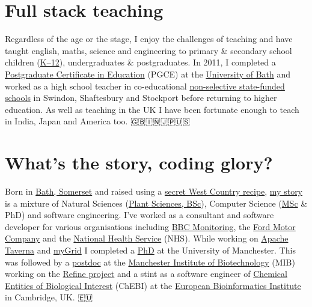 \documentclass[
  12pt,
]{book}
\begin{document}
\hypertarget{full-stack-teaching}{%
\section*{Full stack teaching}\label{full-stack-teaching}}

Regardless of the age or the stage, I enjoy the challenges of teaching and have taught english, maths, science and engineering to primary \& secondary school children (\href{https://en.wikipedia.org/wiki/K\%E2\%80\%9312}{K--12}), undergraduates \& postgraduates. In 2011, I completed a \href{https://en.wikipedia.org/wiki/Postgraduate_Certificate_in_Education}{Postgraduate Certificate in Education} (PGCE) at the \href{https://www.bath.ac.uk/}{University of Bath} and worked as a high school teacher in co-educational \href{https://en.wikipedia.org/wiki/State-funded_schools_(England)}{non-selective state-funded schools} in Swindon, Shaftesbury and Stockport before returning to higher education. As well as teaching in the UK I have been fortunate enough to teach in India, Japan and America too. 🇬🇧🇮🇳🇯🇵🇺🇸

\hypertarget{whats-the-story-coding-glory}{%
\section*{What's the story, coding glory?}\label{whats-the-story-coding-glory}}

Born in \href{https://en.wikipedia.org/wiki/Bath,_Somerset}{Bath, Somerset} and raised using a \href{https://en.wikipedia.org/wiki/West_Country}{secret West Country recipe}, \href{https://uk.linkedin.com/in/duncanhull}{my story} is a mixture of Natural Sciences (\href{http://www.plantsciences.manchester.ac.uk/}{Plant Sciences, BSc}), Computer Science (\href{http://www.cs.man.ac.uk/~hulld/msc2003.html}{MSc} \& PhD) and software engineering. I've worked as a consultant and software developer for various organisations including \href{https://en.wikipedia.org/wiki/BBC_Monitoring}{BBC Monitoring}, the \href{https://en.wikipedia.org/wiki/Ford_Motor_Company}{Ford Motor Company} and the \href{https://en.wikipedia.org/wiki/National_Health_Service}{National Health Service} (NHS). While working on \href{https://en.wikipedia.org/wiki/Apache_Taverna}{Apache Taverna} and \href{https://en.wikipedia.org/wiki/MyGrid}{myGrid} I completed a \href{https://ethos.bl.uk/OrderDetails.do?uin=uk.bl.ethos.497578}{PhD} at the University of Manchester. This was followed by a \href{https://en.wikipedia.org/wiki/Postdoctoral_researcher}{postdoc} at the \href{http://www.mib.ac.uk/}{Manchester Institute of Biotechnology} (MIB) working on the \href{http://www.nactem.ac.uk/pathtext/}{Refine project} and a stint as a software engineer of \href{https://en.wikipedia.org/wiki/ChEBI}{Chemical Entities of Biological Interest} (ChEBI) at the \href{https://en.wikipedia.org/wiki/European_Bioinformatics_Institute}{European Bioinformatics Institute} in Cambridge, UK. 🇪🇺
\end{document}
